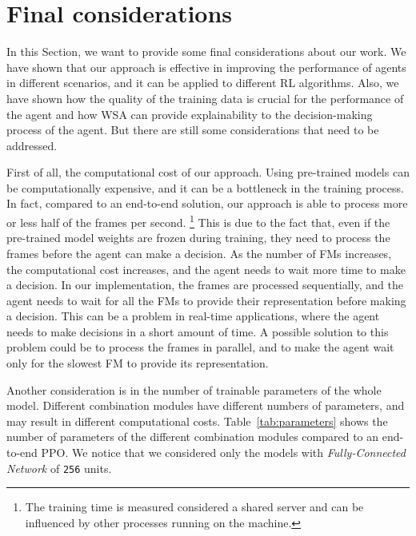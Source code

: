 \section{Final considerations}\label{sec:final-considerations}
In this Section, we want to provide some final considerations about our work.
We have shown that our approach is effective in improving the performance of agents in different scenarios, and it can be applied to different RL algorithms.
Also, we have shown how the quality of the training data is crucial for the performance of the agent and how WSA can provide explainability to the decision-making process of the agent.
But there are still some considerations that need to be addressed.

First of all, the computational cost of our approach.
Using pre-trained models can be computationally expensive, and it can be a bottleneck in the training process.
In fact, compared to an end-to-end solution, our approach is able to process more or less half of the frames per second. \footnote{The training time is measured considered a shared server and can be influenced by other processes running on the machine.}
This is due to the fact that, even if the pre-trained model weights are frozen during training, they need to process the frames before the agent can make a decision.
As the number of FMs increases, the computational cost increases, and the agent needs to wait more time to make a decision.
In our implementation, the frames are processed sequentially, and the agent needs to wait for all the FMs to provide their representation before making a decision.
This can be a problem in real-time applications, where the agent needs to make decisions in a short amount of time.
A possible solution to this problem could be to process the frames in parallel, and to make the agent wait only for the slowest FM to provide its representation.

Another consideration is in the number of trainable parameters of the whole model.
Different combination modules have different numbers of parameters, and may result in different computational costs.
Table~\ref{tab:parameters} shows the number of parameters of the different combination modules compared to an end-to-end PPO.
We notice that we considered only the models with \textit{Fully-Connected Network} of \texttt{256} units.

